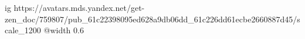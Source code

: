  
 
 
 
 

\begin{center}
\ifcmt
  ig https://avatars.mds.yandex.net/get-zen_doc/759807/pub_61c22398095ed628a9db06dd_61c226dd61ecbe2660887d45/scale_1200
  @width 0.6
\fi


\end{center}
